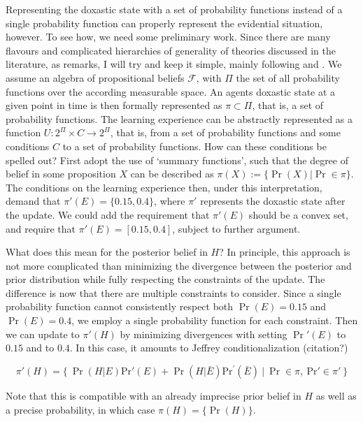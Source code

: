 \documentclass[11pt, a4paper]{scrartcl}
\begin{document}
Representing the doxastic state with a set of probability functions instead of a single probability function can properly represent the evidential situation, however. To see how, we need some preliminary work. Since there are many flavours and complicated hierarchies of generality of theories discussed in the literature, as \citet{Norton2011-NORCTB} remarks, I will try and keep it simple, mainly following \citet{sep-imprecise-probabilities} and \citet{Grove:1998:USP:2074094.2074115}. We assume an algebra of propositional beliefs $\mathcal{F}$, with $\Pi$ the set of all probability functions over the according measurable space. An agents doxastic state at a given point in time is then formally represented as $\pi \subset \Pi$, that is, a set of probability functions. The learning experience can be abstractly represented as a function $U: 2^{\Pi} \times C \rightarrow 2^{\Pi}$, that is, from a set of probability functions and some conditions $C$ to a set of probability functions. How can these conditions be spelled out? First adopt the use of `summary functions', such that the degree of belief in some proposition $X$ can be described as ${\pi(X) := \{ \Pr(X) \vert \Pr \in \pi\}}$. The conditions on the learning experience then, under this interpretation, demand that $\pi'(E) = \{0.15, 0.4\}$, where $\pi'$ represents the doxastic state after the update. We could add the requirement that $\pi'(E)$ should be a convex set, and require that $\pi'(E)= [0.15,0.4]$, subject to further argument.

What does this mean for the posterior belief in $H$? In principle, this approach is not more complicated than minimizing the divergence between the posterior and prior distribution while fully respecting the constraints of the update. The difference is now that there are multiple constraints to consider. Since a single probability function cannot consistently respect both $\Pr(E) = 0.15$ and $\Pr(E) = 0.4$, we employ a single probability function for each constraint. Then we can update to $\pi'(H)$ by minimizing divergences with setting $\Pr'(E)$ to $0.15$ and to $0.4$. In this case, it amounts to Jeffrey conditionalization (citation?)

\begin{equation*} 
    \pi'(H) = \{~ \Pr(H\vert E)\text{Pr}'(E) + \Pr(H\vert\bar{E})\text{Pr}^{\prime}(\bar{E}) ~\vert~ \Pr \in \pi,~ \text{Pr}' \in \pi'~\}
\end{equation*}

Note that this is compatible with an already imprecise prior belief in $H$ as well as a precise probability, in which case $\pi(H) = \{\Pr(H)\}$.
\end{document}
